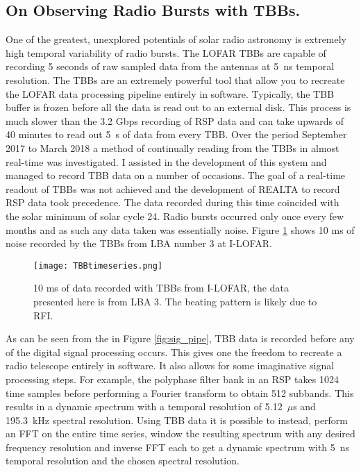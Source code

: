 \subsection{On Observing Radio Bursts with TBBs.}
One of the greatest, unexplored potentials of solar radio astronomy is extremely high temporal variability of radio bursts. The LOFAR TBBs are capable of recording 5 seconds of raw sampled data from the antennas at 5~ns temporal resolution. The TBBs are an extremely powerful tool that allow you to recreate the LOFAR data processing pipeline entirely in software. Typically, the TBB buffer is frozen before all the data is read out to an external disk. This process is much slower than the 3.2 Gbps recording of RSP data and can take upwards of 40 minutes to read out 5~s of data from every TBB. Over the period September 2017 to March 2018 a method of continually reading from the TBBs in almost real-time was investigated. I assisted in the development of this system and managed to record TBB data on a number of occasions. The goal of a real-time readout of TBBs was not achieved and the development of REALTA to record RSP data took precedence. The data recorded during this time coincided with the solar minimum of solar cycle 24. Radio bursts occurred only once every few months and as such any data taken was essentially noise. Figure \ref{fig:TBB_timeseries} shows 10 ms of noise recorded by the TBBs from LBA number 3 at I-LOFAR.
%
\begin{figure}[ht]
\centering
\texttt{[image: TBBtimeseries.png]}
\caption[10 ms of data recorded with TBBs from I-LOFAR.]{10 ms of data recorded with TBBs from I-LOFAR, the data presented here is from LBA 3. The beating pattern is likely due to RFI.}
\label{fig:TBB_timeseries}
\end{figure}

As can be seen from the in Figure \ref{fig:sig_pipe}, TBB data is recorded before any of the digital signal processing occurs. This gives one the freedom to recreate a radio telescope entirely in software. It also allows for some imaginative signal processing steps. For example, the polyphase filter bank in an RSP takes 1024 time samples before performing a Fourier transform to obtain 512 subbands. This results in a dynamic spectrum with a temporal resolution of 5.12~$\mu$s and 195.3~kHz spectral resolution. Using TBB data it is possible to instead, perform an FFT on the entire time series, window the resulting spectrum with any desired frequency resolution and inverse FFT each to get a dynamic spectrum with 5~ns temporal resolution and the chosen spectral resolution. 

